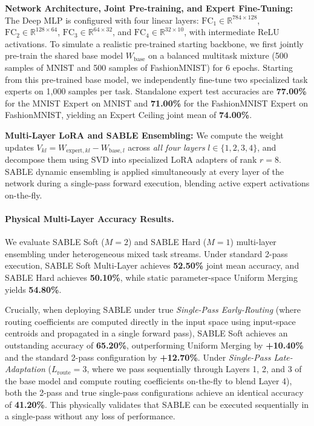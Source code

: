 \textbf{Network Architecture, Joint Pre-training, and Expert Fine-Tuning:} The Deep MLP is configured with four linear layers: $\text{FC}_1 \in \mathbb{R}^{784 \times 128}$, $\text{FC}_2 \in \mathbb{R}^{128 \times 64}$, $\text{FC}_3 \in \mathbb{R}^{64 \times 32}$, and $\text{FC}_4 \in \mathbb{R}^{32 \times 10}$, with intermediate ReLU activations. To simulate a realistic pre-trained starting backbone, we first jointly pre-train the shared base model $W_{\text{base}}$ on a balanced multitask mixture (500 samples of MNIST and 500 samples of FashionMNIST) for 6 epochs. Starting from this pre-trained base model, we independently fine-tune two specialized task experts on 1,000 samples per task. Standalone expert test accuracies are \textbf{77.00\%} for the MNIST Expert on MNIST and \textbf{71.00\%} for the FashionMNIST Expert on FashionMNIST, yielding an Expert Ceiling joint mean of \textbf{74.00\%}.

\textbf{Multi-Layer LoRA and SABLE Ensembling:} We compute the weight updates $V_{kl} = W_{\text{expert}, kl} - W_{\text{base}, l}$ across \emph{all four layers} $l \in \{1, 2, 3, 4\}$, and decompose them using SVD into specialized LoRA adapters of rank $r=8$. SABLE dynamic ensembling is applied simultaneously at every layer of the network during a single-pass forward execution, blending active expert activations on-the-fly.

\paragraph{Physical Multi-Layer Accuracy Results.} We evaluate SABLE Soft ($M=2$) and SABLE Hard ($M=1$) multi-layer ensembling under heterogeneous mixed task streams. Under standard 2-pass execution, SABLE Soft Multi-Layer achieves \textbf{52.50\%} joint mean accuracy, and SABLE Hard achieves \textbf{50.10\%}, while static parameter-space Uniform Merging yields \textbf{54.80\%}. 

Crucially, when deploying SABLE under true \emph{Single-Pass Early-Routing} (where routing coefficients are computed directly in the input space using input-space centroids and propagated in a single forward pass), SABLE Soft achieves an outstanding accuracy of \textbf{65.20\%}, outperforming Uniform Merging by \textbf{+10.40\%} and the standard 2-pass configuration by \textbf{+12.70\%}. Under \emph{Single-Pass Late-Adaptation} ($L_{\text{route}}=3$, where we pass sequentially through Layers 1, 2, and 3 of the base model and compute routing coefficients on-the-fly to blend Layer 4), both the 2-pass and true single-pass configurations achieve an identical accuracy of \textbf{41.20\%}. This physically validates that SABLE can be executed sequentially in a single-pass without any loss of performance.

